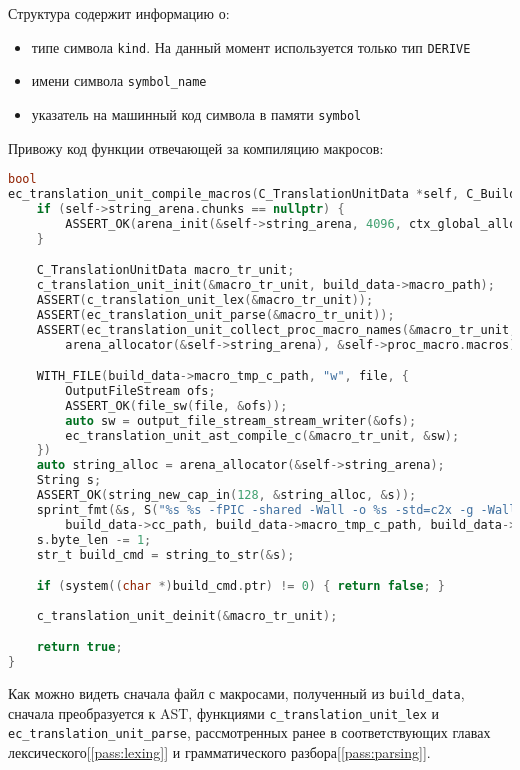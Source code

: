 Структура содержит информацию о:
\begin{itemize}
    \item типе символа \verb|kind|. На данный момент используется только тип \verb|DERIVE|
    \item имени символа \verb|symbol_name|
    \item указатель на машинный код символа в памяти \verb|symbol|
\end{itemize}
    
Привожу код функции отвечающей за компиляцию макросов:

\begin{lstlisting}[language=c, caption={Реализация функции компиляции макросов}, label={pass:macros:compile-impl}]
bool
ec_translation_unit_compile_macros(C_TranslationUnitData *self, C_BuildData *build_data) {
    if (self->string_arena.chunks == nullptr) {
        ASSERT_OK(arena_init(&self->string_arena, 4096, ctx_global_alloc));
    }

    C_TranslationUnitData macro_tr_unit;
    c_translation_unit_init(&macro_tr_unit, build_data->macro_path);
    ASSERT(c_translation_unit_lex(&macro_tr_unit));
    ASSERT(ec_translation_unit_parse(&macro_tr_unit));
    ASSERT(ec_translation_unit_collect_proc_macro_names(&macro_tr_unit, 
        arena_allocator(&self->string_arena), &self->proc_macro.macros));

    WITH_FILE(build_data->macro_tmp_c_path, "w", file, {
        OutputFileStream ofs;
        ASSERT_OK(file_sw(file, &ofs));
        auto sw = output_file_stream_stream_writer(&ofs);
        ec_translation_unit_ast_compile_c(&macro_tr_unit, &sw);
    })
    auto string_alloc = arena_allocator(&self->string_arena);
    String s;
    ASSERT_OK(string_new_cap_in(128, &string_alloc, &s));
    sprint_fmt(&s, S("%s %s -fPIC -shared -Wall -o %s -std=c2x -g -Wall -I. -I./lib -L./build -lec\0"), 
        build_data->cc_path, build_data->macro_tmp_c_path, build_data->macro_lib_path);
    s.byte_len -= 1;
    str_t build_cmd = string_to_str(&s);

    if (system((char *)build_cmd.ptr) != 0) { return false; }
    
    c_translation_unit_deinit(&macro_tr_unit);

    return true;
}
\end{lstlisting}

Как можно видеть сначала файл с макросами, полученный из \verb|build_data|, сначала преобразуется к AST, 
функциями \verb|c_translation_unit_lex| и \verb|ec_translation_unit_parse|, 
рассмотренных ранее в соответствующих главах лексического[\ref{pass:lexing}] и грамматического разбора[\ref{pass:parsing}].

